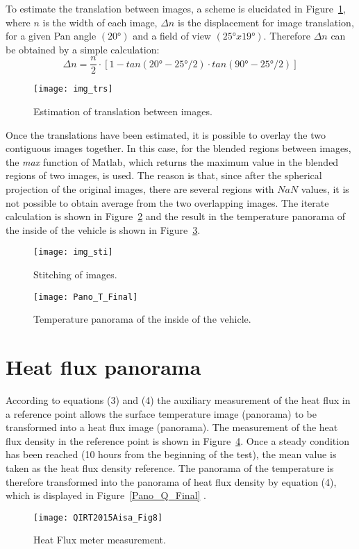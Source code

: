 \documentclass{tQRT2e}
\begin{document}
To estimate the translation between images, a scheme is elucidated in Figure~\ref{Trans}, where $ n $ is the width of each image, $ \Delta n $ is the displacement for image translation, for a given Pan angle $ (20°) $ and a field of view $ (25°x19°) $. Therefore $ \Delta n $ can be obtained by a simple calculation:
\begin{equation}
\Delta n=\dfrac{n}{2}⋅[1-tan(20°-25°/2)\cdot tan(90°-25°/2)]
\end{equation}

\begin{figure}[ht]
	\centering
	\texttt{[image: img\_trs]}
	\caption{ Estimation of translation between images.}
	\label{Trans}
\end{figure}

Once the translations have been estimated, it is possible to overlay the two contiguous images together. In this case, for the blended regions between images, the \textit{max} function of Matlab, which returns the maximum value in the blended regions of two images, is used. The reason is that, since after the spherical projection of the original images, there are several regions with $ NaN $ values, it is not possible to obtain average from the two overlapping images. The iterate calculation is shown in Figure~\ref{img_sti} and the result in the temperature panorama of the inside of the vehicle is shown in Figure~\ref{Pano_T_Final}.
\begin{figure}[ht]
	\centering
	\texttt{[image: img\_sti]}
	\caption{Stitching of images.}
	\label{img_sti}
\end{figure}

\begin{figure}[ht]
	\hspace*{-20pt}
	\texttt{[image: Pano\_T\_Final]}
	\caption{Temperature panorama of the inside of the vehicle.}
	\label{Pano_T_Final}
\end{figure}

\section{Heat flux panorama}
According to equations (3) and (4) the auxiliary measurement of the heat flux in a reference point allows the surface temperature image (panorama) to be transformed into a heat flux image (panorama). The measurement of the heat flux density in the reference point is shown in Figure~\ref{Flux_meter}. Once a steady condition has been reached (10 hours from the beginning of the test), the mean value is taken as the heat flux density reference. The panorama of the temperature is therefore transformed into the panorama of heat flux density by equation (4), which is displayed in Figure~\ref{Pano_Q_Final} . 
\begin{figure}[ht]
	\centering
	\texttt{[image: QIRT2015Aisa\_Fig8]}
	\caption{Heat Flux meter measurement.}
	\label{Flux_meter}
\end{figure}
\end{document}
